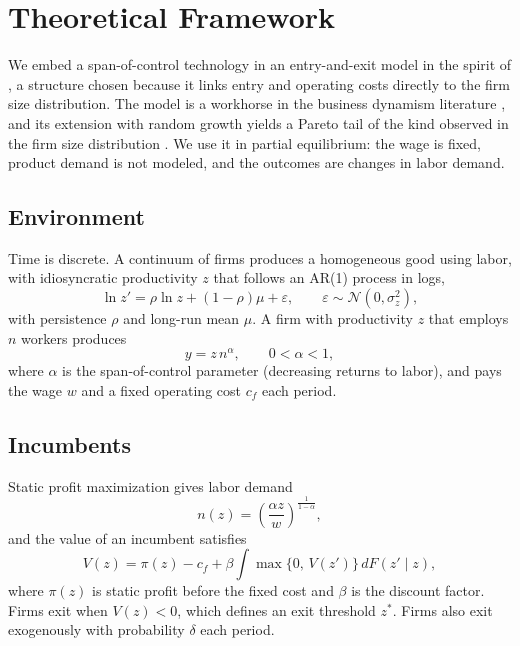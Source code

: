 \section{Theoretical Framework}\label{sec:theory}

We embed a span-of-control technology \citep{lucas1978size} in an entry-and-exit model in the spirit of \citet{hopenhayn1992entry}, a structure chosen because it links entry and operating costs directly to the firm size distribution.
The model is a workhorse in the business dynamism literature \citep{decker2014role,haltiwanger2013who}, and its extension with random growth yields a Pareto tail of the kind observed in the firm size distribution \citep{luttmer2007selection,axtell2001zipf}.
We use it in partial equilibrium: the wage is fixed, product demand is not modeled, and the outcomes are changes in labor demand.

\subsection{Environment}\label{sec:theory-env}

Time is discrete.
A continuum of firms produces a homogeneous good using labor, with idiosyncratic productivity $z$ that follows an AR(1) process in logs,
\begin{equation}\label{eq:productivity-process}
  \ln z' = \rho \ln z + (1-\rho)\mu + \varepsilon, \qquad \varepsilon \sim \mathcal{N}(0, \sigma_z^2),
\end{equation}
with persistence $\rho$ and long-run mean $\mu$.
A firm with productivity $z$ that employs $n$ workers produces
\begin{equation}\label{eq:production}
  y = z\, n^{\alpha}, \qquad 0 < \alpha < 1,
\end{equation}
where $\alpha$ is the span-of-control parameter (decreasing returns to labor), and pays the wage $w$ and a fixed operating cost $c_f$ each period.

\subsection{Incumbents}\label{sec:theory-incumbents}

Static profit maximization gives labor demand
\begin{equation}\label{eq:labor-demand}
  n(z) = \left( \frac{\alpha z}{w} \right)^{\frac{1}{1-\alpha}},
\end{equation}
and the value of an incumbent satisfies
\begin{equation}\label{eq:value}
  V(z) = \pi(z) - c_f + \beta \int \max\bigl\{ 0,\, V(z') \bigr\}\, dF(z' \mid z),
\end{equation}
where $\pi(z)$ is static profit before the fixed cost and $\beta$ is the discount factor.
Firms exit when $V(z) < 0$, which defines an exit threshold $z^{*}$.
Firms also exit exogenously with probability $\delta$ each period.

